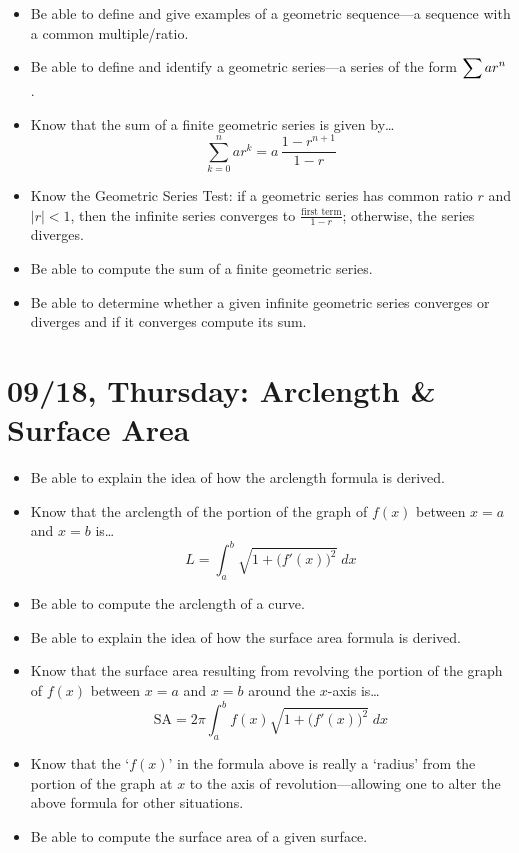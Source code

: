 \documentclass[11pt,letterpaper]{article}
\begin{document}
\begin{itemize}
\item Be able to define and give examples of a geometric sequence---a sequence with a common multiple/ratio.
\item Be able to define and identify a geometric series---a series of the form $\displaystyle\sum a r^n$. 
\item Know that the sum of a finite geometric series is given by\dots
	\[
	\sum_{k=0}^n a r^k= a \, \dfrac{1 - r^{n+1}}{1 - r}
	\]
\item Know the Geometric Series Test: if a geometric series has common ratio $r$ and $|r| < 1$, then the infinite series converges to $\frac{\text{first term}}{1 - r}$; otherwise, the series diverges. 
\item Be able to compute the sum of a finite geometric series. 
\item Be able to determine whether a given infinite geometric series converges or diverges and if it converges compute its sum. 
\end{itemize}

\newpage
\section*{09/18, Thursday: Arclength \& Surface Area\label{09-18}}

\begin{itemize}
\item Be able to explain the idea of how the arclength formula is derived. 
\item Know that the arclength of the portion of the graph of $f(x)$ between $x= a$ and $x= b$ is\dots
	\[
	L= \int_a^b \sqrt{1 + \big( f'(x) \big)^2} \;dx
	\]
\item Be able to compute the arclength of a curve.
\item Be able to explain the idea of how the surface area formula is derived. 
\item Know that the surface area resulting from revolving the portion of the graph of $f(x)$ between $x= a$ and $x= b$ around the $x$-axis is\dots
	\[
	\text{SA}= 2\pi \int_a^b f(x) \sqrt{1 + \big( f'(x) \big)^2} \;dx
	\]
\item Know that the `$f(x)$' in the formula above is really a `radius' from the portion of the graph at $x$ to the axis of revolution---allowing one to alter the above formula for other situations. 
\item Be able to compute the surface area of a given surface. 
\end{itemize}
\end{document}
